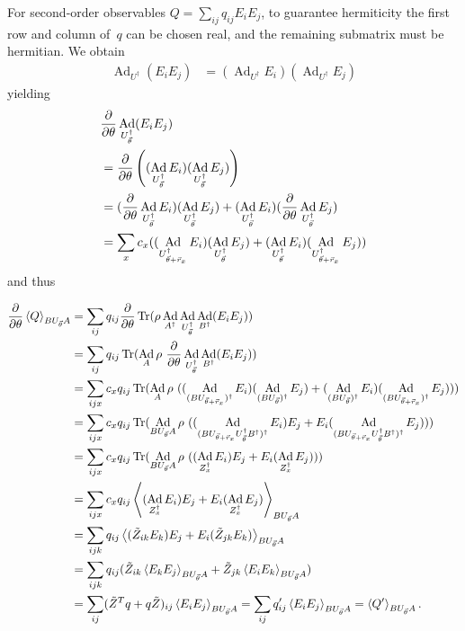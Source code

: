 \documentclass[aps,pra,10pt,twocolumn,groupedaddress,nofootinbib]{revtex4-1}
\theoremstyle{plain}
\DeclareMathOperator{\tr}{Tr}
\DeclareMathOperator{\Ad}{Ad}
\newcommand{\pd}[2]{\frac{\partial #1}{\partial #2}}  %
\newcommand{\expect}[1]{\ensuremath{\left\langle #1 \right\rangle}} %
\newcommand{\Admap}[1]{\tilde{#1}} %
\begin{document}
For second-order observables $Q = \sum_{ij} q_{ij} E_i E_j$,
to guarantee hermiticity the first row and column of~$q$
can be chosen real, and the remaining submatrix must be hermitian.
We obtain
\begin{align*}
\Ad_{U^\dagger} (E_i E_j)
&= (\Ad_{U^\dagger} E_i) (\Ad_{U^\dagger} E_j)
\end{align*}
yielding
\begin{align*}
&\pd{}{\theta} \Ad_{U_{\vt}^\dagger} (E_i E_j)\\
&=
\pd{}{\theta} \left((\Ad_{U_{\vt}^\dagger} E_i) (\Ad_{U_{\vt}^\dagger} E_j)\right)\\
&=
(\pd{}{\theta} \Ad_{U_{\vt}^\dagger} E_i) (\Ad_{U_{\vt}^\dagger} E_j)
+(\Ad_{U_{\vt}^\dagger} E_i) (\pd{}{\theta} \Ad_{U_{\vt}^\dagger} E_j)\\
&=
\sum_x c_x ((\Ad_{U_{\vt+\vR_x}^\dagger} E_i) (\Ad_{U_{\vt}^\dagger} E_j)
+(\Ad_{U_{\vt}^\dagger} E_i) (\Ad_{U_{\vt+\vR_x}^\dagger} E_j))
\end{align*}
and thus
\begin{widetext}
\begin{align}
\label{eq:d_ev2_cv}
\notag
\pd{}{\theta} \expect{Q}_{B U_{\vt} A}
&= \sum_{ij} q_{ij} \pd{}{\theta} \tr(\rho \Ad_{A^\dagger} \Ad_{U_{\vt}^\dagger} \Ad_{B^\dagger} (E_i E_j))\\
\notag
&= \sum_{ij} q_{ij} \tr(\Ad_{A} \rho \ \pd{}{\theta} \Ad_{U_{\vt}^\dagger} \Ad_{B^\dagger} (E_i E_j))\\
\notag
&= \sum_{ijx} c_x q_{ij} \tr(\Ad_{A} \rho \ ((\Ad_{(B U_{\vt+\vR_x})^\dagger} E_i)(\Ad_{(BU_{\vt})^\dagger} E_j) +(\Ad_{(BU_{\vt})^\dagger} E_i)(\Ad_{(BU_{\vt+\vR_x})^\dagger} E_j)))\\
\notag
&= \sum_{ijx} c_x q_{ij} \tr(\Ad_{B U_{\vt} A} \rho \ ((\Ad_{(B U_{\vt+\vR_x} U_{\vt}^\dagger B^\dagger)^\dagger} E_i) E_j +E_i (\Ad_{(B U_{\vt+\vR_x} U_{\vt}^\dagger B^\dagger)^\dagger} E_j)))\\
\notag
&= \sum_{ijx} c_x q_{ij} \tr(\Ad_{B U_{\vt} A} \rho \ ((\Ad_{Z_x^\dagger} E_i) E_j +E_i (\Ad_{Z_x^\dagger} E_j)))\\
\notag
&= \sum_{ijx} c_x q_{ij} \expect{(\Ad_{Z_x^\dagger} E_i) E_j +E_i (\Ad_{Z_x^\dagger} E_j)}_{B U_{\vt} A}\\
\notag
&= \sum_{ijk} q_{ij} \expect{(\Admap{Z}_{ik} E_k) E_j +E_i (\Admap{Z}_{jk} E_k)}_{B U_{\vt} A}\\
\notag
&= \sum_{ijk} q_{ij} (\Admap{Z}_{ik} \expect{E_k E_j}_{B U_{\vt} A} +\Admap{Z}_{jk} \expect{E_i E_k}_{B U_{\vt} A})\\
&= \sum_{ij} (\Admap{Z}^T q +q \Admap{Z})_{ij} \expect{E_i E_j}_{B U_{\vt} A}
= \sum_{ij} q'_{ij} \expect{E_i E_j}_{B U_{\vt} A}
= \expect{Q'}_{B U_{\vt} A}.
\end{align}
\end{widetext}
\end{document}

